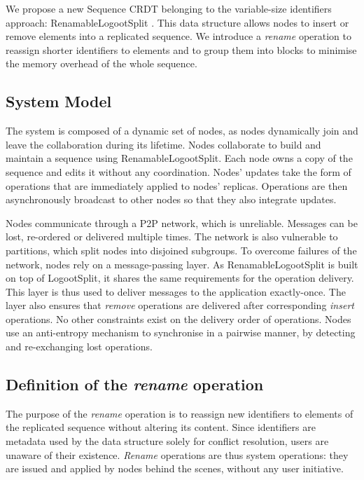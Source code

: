 \documentclass[10pt,journal,compsoc]{IEEEtran}
\begin{document}
We propose a new Sequence \ac{CRDT} belonging to the variable-size identifiers approach: RenamableLogootSplit \cite{nicolas:hal-01932552,nicolas:hal-02526724}.
This data structure allows nodes to insert or remove elements into a replicated sequence.
We introduce a \emph{rename} operation to reassign shorter identifiers to elements and to group them into blocks to minimise the memory overhead of the whole sequence.

\subsection{System Model}

The system is composed of a dynamic set of nodes, as nodes dynamically join and leave the collaboration during its lifetime.
Nodes collaborate to build and maintain a sequence using RenamableLogootSplit.
Each node owns a copy of the sequence and edits it without any coordination.
Nodes' updates take the form of operations that are immediately applied to nodes' replicas.
Operations are then asynchronously broadcast to other nodes so that they also integrate updates.

Nodes communicate through a \ac{P2P} network, which is unreliable.
Messages can be lost, re-ordered or delivered multiple times.
The network is also vulnerable to partitions, which split nodes into disjoined subgroups.
To overcome failures of the network, nodes rely on a message-passing layer.
As RenamableLogootSplit is built on top of LogootSplit, it shares the same requirements for the operation delivery.
This layer is thus used to deliver messages to the application exactly-once.
The layer also ensures that \emph{remove} operations are delivered after corresponding \emph{insert} operations.
No other constraints exist on the delivery order of operations.
Nodes use an anti-entropy mechanism \cite{10.1109/TSE.1983.236733} to synchronise in a pairwise manner, by detecting and re-exchanging lost operations.

\subsection{Definition of the \emph{rename} operation}

\label{sec:definition-rename-operation}

The purpose of the \emph{rename} operation is to reassign new identifiers to elements of the replicated sequence without altering its content.
Since identifiers are metadata used by the data structure solely for conflict resolution, users are unaware of their existence.
\emph{Rename} operations are thus system operations: they are issued and applied by nodes behind the scenes, without any user initiative.
\end{document}
